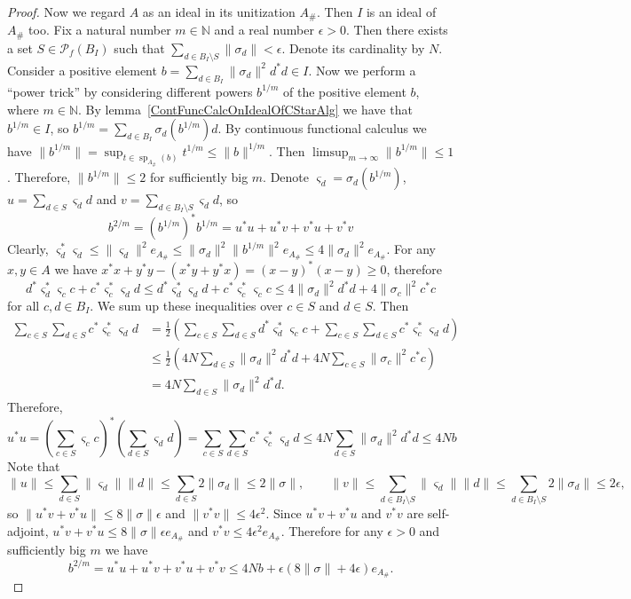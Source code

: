 \begin{proof}
Now we regard $A$ as an ideal in its unitization $A_\#$. Then $I$ is an ideal of
$A_\#$ too. Fix a natural number $m\in\mathbb{N}$ and a real number
$\epsilon>0$. Then there exists a set $S\in\mathcal{P}_{f}(B_I)$ such that
$\sum_{d\in B_I\setminus S}\lVert\sigma_d\rVert<\epsilon$. Denote its cardinality
by $N$. Consider a positive element 
$b=\sum_{d\in B_I}\lVert\sigma_d\rVert^2 d^*d\in I$. Now we perform 
a ``power trick'' by considering different powers $b^{1/m}$ of the positive element 
$b$, where $m\in\mathbb{N}$. By lemma~\ref{ContFuncCalcOnIdealOfCStarAlg} we 
have that $b^{1/m}\in I$, so $b^{1/m}=\sum_{d\in B_I}\sigma_d(b^{1/m})d$. 
By continuous functional calculus we have 
$\lVert b^{1/m}\rVert
=\sup_{t\in\operatorname{sp}_{A_\#}(b)} t^{1/m}\leq\lVert b\rVert^{1/m}$. Then $\limsup_{m\to\infty}\lVert b^{1/m}\rVert\leq 1$. 
Therefore, $\lVert b^{1/m}\rVert\leq 2$ for sufficiently big $m$. Denote
$\varsigma_d=\sigma_d(b^{1/m})$, $u=\sum_{d\in S}\varsigma_d d$ and
$v=\sum_{d\in B_I\setminus S}\varsigma_d d$, so 
\[
b^{2/m}={(b^{1/m})}^*b^{1/m}=u^*u+u^*v+v^*u+v^*v
\]
Clearly, $\varsigma_d^*\varsigma_d\leq \lVert \varsigma_d\rVert^2 e_{A_\#}\leq
\lVert \sigma_d\rVert^2\lVert b^{1/m}\rVert^2 e_{A_\#}\leq 4\lVert \sigma_d\rVert^2
e_{A_\#}$. For any $x,y\in A$ we have $x^*x+y^*y-(x^*y+y^*x)={(x-y)}^*(x-y)\geq
0$, therefore 
\[
d^*\varsigma_d^* \varsigma_c c+c^*\varsigma_c^* \varsigma_d d
\leq d^*\varsigma_d^*\varsigma_d d + c^*\varsigma_c^*\varsigma_c c
\leq 4\lVert \sigma_d\rVert^2 d^*d+4\lVert \sigma_c\rVert^2 c^*c
\]
for all $c,d\in B_I$. We sum up these inequalities over $c\in S$ and $d\in S$. Then 
\[
\begin{aligned}
\sum_{c\in S}\sum_{d\in S}c^*\varsigma_c^* \varsigma_d d
&=\frac{1}{2}\left(
    \sum_{c\in S}\sum_{d\in S}d^*\varsigma_d^* \varsigma_c c
    +
    \sum_{c\in S}\sum_{d\in S}c^*\varsigma_c^* \varsigma_d d
\right)\\
&\leq\frac{1}{2}\left(4 N\sum_{d\in S} \lVert \sigma_d\rVert^2 d^*d+
4 N\sum_{c\in S} \lVert \sigma_c\rVert^2 c^*c\right)\\
&=4 N\sum_{d\in S} \lVert \sigma_d\rVert^2 d^*d.
\end{aligned}
\]
Therefore,
\[
u^*u
={\left(\sum_{c\in S}\varsigma_c c\right)}^*
\left(\sum_{d\in S}\varsigma_d d\right)
=\sum_{c\in S}\sum_{d\in S}c^*\varsigma_c^* \varsigma_d d
\leq 4N\sum_{d\in S} \lVert \sigma_d\rVert^2 d^*d
\leq 4N b
\]
Note that
\[
\lVert u\rVert
\leq \sum_{d\in S}\lVert\varsigma_d\rVert\lVert d\rVert
\leq \sum_{d\in S}2\lVert\sigma_d\rVert
\leq 2\lVert\sigma\rVert,
\qquad
\lVert v\rVert
\leq \sum_{d\in B_I\setminus S}\lVert\varsigma_d\rVert\lVert d\rVert
\leq \sum_{d\in B_I\setminus S}2\lVert\sigma_d\rVert
\leq 2\epsilon,
\]
so $\lVert u^*v+v^*u\rVert\leq 8\lVert\sigma\rVert\epsilon$ 
and $\lVert v^*v\rVert\leq 4\epsilon^2$. Since $u^*v+v^*u$ and $v^*v$ are self-adjoint, $u^*v+v^*u\leq 8\lVert\sigma\rVert\epsilon e_{A_\#}$ 
and $v^*v\leq 4\epsilon^2 e_{A_\#}$. Therefore for any $\epsilon>0$ and 
sufficiently big $m$ we have 
\[
b^{2/m}
=u^*u+u^*v+v^*u+v^*v
\leq 4Nb+\epsilon(8\lVert\sigma\rVert+4\epsilon)e_{A_\#}.
\]



\end{proof}
